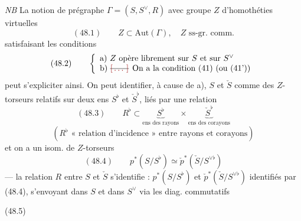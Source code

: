 \documentclass[11pt,a4paper]{article}
\begin{document}
\emph{NB} La notion de prégraphe $\Gamma = (S, S^{\vee}, R)$ avec groupe $Z$ d'homothéties virtuelles
\[
(48.1) \qquad Z \subset \mathrm{Aut}(\Gamma) , \quad Z \text{ ss-gr. comm.}
\]
satisfaisant les conditions
\[
(48.2) \qquad
\left\{
\begin{array}{l}
\text{a) } Z \text{ opère librement sur $S$ et sur } S^{\vee} \\
\text{b) \struck{\ill{}} On a la condition (41) (ou (41'))}
\end{array}
\right.
\]
peut s'expliciter ainsi. On peut identifier, à cause de a), $S$ et $\check{S}$ comme des $Z$-torseurs relatifs sur deux ens $S^{\flat}$ et $\check{S}^{\flat}$, liés par une relation
\[
(48.3) \qquad R^{\flat} \subset \underbrace{S^{\flat}}_{\text{ens des rayons}} \times \underbrace{\check{S}^{\flat}}_{\text{ens des corayons}}
\]
\[
(R^{\flat} \text{ « relation d'incidence » entre rayons et corayons})
\]
et on a un isom. de $Z$-torseurs
\[
(48.4) \qquad p^{*}(S/S^{\flat}) \simeq \check{p}^{*}(\check{S}/S^{\vee\flat})
\]
--- la relation $R$ entre $S$ et $\check{S}$ s'identifie : $p^{*}(S/S^{\flat})$ et $\check{p}^{*}(\check{S}/S^{\vee\flat})$ identifiés par (48.4), s'envoyant dans $S$ et dans $S^{\vee}$ via les diag. commutatifs

(48.5)


\end{document}
